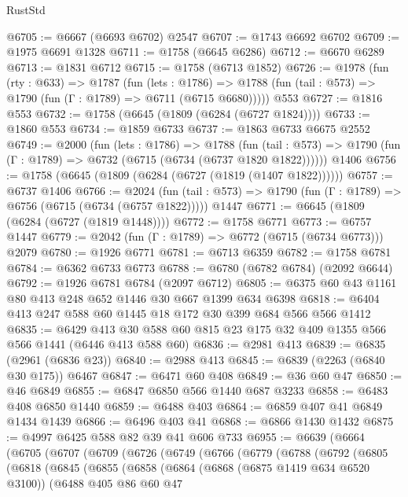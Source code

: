 \begin{lexlean}{RustStd}
\begin{coremodule}
{\begin{coremodule}
{{{{{{{{{{{{{{{@6705 := @6667 (@6693 @6702) @2547
@6707 := @1743 @6692 @6702
@6709 := @1975 @6691 @1328
@6711 := @1758 (@6645 @6286)
@6712 := @6670 @6289
@6713 := @1831 @6712
@6715 := @1758 (@6713 @1852)
@6726 := @1978
    (fun (rty : @633) =>
    @1787
      (fun (lets : @1786) =>
      @1788 (fun (tail : @573) => @1790 (fun (Γ : @1789) => @6711 (@6715 @6680)))))
    @553
@6727 := @1816 @553
@6732 := @1758 (@6645 (@1809 (@6284 (@6727 @1824))))
@6733 := @1860 @553
@6734 := @1859 @6733
@6737 := @1863 @6733 @6675 @2552
@6749 := @2000
    (fun (lets : @1786) =>
    @1788
      (fun (tail : @573) => @1790 (fun (Γ : @1789) => @6732 (@6715 (@6734 (@6737 @1820 @1822))))))
    @1406
@6756 := @1758 (@6645 (@1809 (@6284 (@6727 (@1819 (@1407 @1822))))))
@6757 := @6737 @1406
@6766 := @2024
    (fun (tail : @573) => @1790 (fun (Γ : @1789) => @6756 (@6715 (@6734 (@6757 @1822)))))
    @1447
@6771 := @6645 (@1809 (@6284 (@6727 (@1819 @1448))))
@6772 := @1758 @6771
@6773 := @6757 @1447
@6779 := @2042 (fun (Γ : @1789) => @6772 (@6715 (@6734 @6773))) @2079
@6780 := @1926 @6771
@6781 := @6713 @6359
@6782 := @1758 @6781
@6784 := @6362 @6733 @6773
@6788 := @6780 (@6782 @6784) (@2092 @6644)
@6792 := @1926 @6781 @6784 (@2097 @6712)
@6805 := @6375 @60 @43 @1161 @80 @413 @248 @652 @1446 @30 @667 @1399 @634 @6398
@6818 := @6404 @413 @247 @588 @60 @1445 @18 @172 @30 @399 @684 @566 @566 @1412
@6835 := @6429 @413 @30 @588 @60 @815 @23 @175 @32 @409 @1355 @566 @566 @1441 (@6446 @413 @588 @60)
@6836 := @2981 @413
@6839 := @6835 (@2961 (@6836 @23))
@6840 := @2988 @413
@6845 := @6839 (@2263 (@6840 @30 @175)) @6467
@6847 := @6471 @60 @408
@6849 := @36 @60 @47
@6850 := @46 @6849
@6855 := @6847 @6850 @566 @1440 @687 @3233
@6858 := @6483 @408 @6850 @1440
@6859 := @6488 @403
@6864 := @6859 @407 @41 @6849 @1434 @1439
@6866 := @6496 @403 @41
@6868 := @6866 @1430 @1432
@6875 := @4997 @6425 @588 @82 @39 @41 @606 @733
@6955 := @6639
    (@6664
      (@6705
        (@6707
          (@6709
            (@6726
              (@6749
                (@6766
                  (@6779
                    (@6788
                      (@6792
                        (@6805
                          (@6818
                            (@6845
                              (@6855
                                (@6858
                                  (@6864
                                    (@6868 (@6875 @1419 @634 @6520 @3100))
                                    (@6488
                                      @405
                                      @86
                                      @60
                                      @47
}}}}}}}}}}}}}}}
\end{coremodule}}
\end{coremodule}
\end{lexlean}
